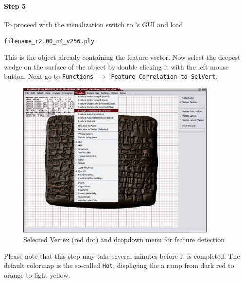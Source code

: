 \paragraph*{Step 5}
To proceed with the visualization switch to \GigaMesh\!\!'s GUI and load 
\begin{center} \texttt{filename\_r2.00\_n4\_v256.ply} \end{center}
This is the object already containing the feature vector. 
Now select the deepest wedge on the surface of the object by double clicking it with the left mouse button. Next go to \texttt{Functions $\rightarrow$ Feature Correlation to SelVert}.
\begin{figure}[H]
\begin{center}
    \includegraphics[width=10cm]{figs/Feature_Correlation}
    \caption{Selected Vertex (red dot) and dropdown menu for feature detection}
\end{center}
\end{figure}
Please note that this step may take several minutes before it is completed. The default colormap is the so-called {\tt Hot}, displaying the a ramp from dark red to orange to light yellow.

